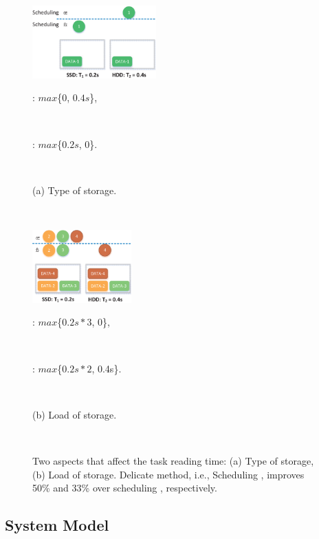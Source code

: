 \documentclass[conference]{IEEEtran}
\begin{document}
\begin{figure}[!t]
\centering
    \begin{minipage}{4.78cm}
        \includegraphics[height = 2.8cm]{fig_example1_5.eps}
        \centerline{\footnotesize{\uppercase\expandafter{} : $max$\{0, $0.4s$\},\quad}}\\
        \centerline{\footnotesize{\uppercase\expandafter{} : $max$\{$0.2s$, 0\}.\quad}}\\
         \centerline{(a) Type of storage.}\\
    \end{minipage}
    \begin{minipage}{3.95cm}
        \includegraphics[height = 2.8cm]{fig_example2_4.eps}
        \centerline{\footnotesize{\uppercase\expandafter{} : $max$\{$0.2s*3$, 0\},\quad}}\\
        \centerline{\footnotesize{\uppercase\expandafter{} : $max$\{$0.2s*2$, 0.4s\}.}}\\
         \centerline{(b) Load of storage.\quad}\\
    \end{minipage}
    \vspace{-0.4cm}
    \caption{Two aspects that affect the task reading time: (a) Type of storage, (b) Load of storage. Delicate method, i.e., Scheduling \uppercase\expandafter{}, improves 50\% and 33\% over scheduling \uppercase\expandafter{}, respectively.}
    \label{Fig:example}
    \vspace{-0.4cm}
\end{figure}

\subsection{System Model}
\end{document}
